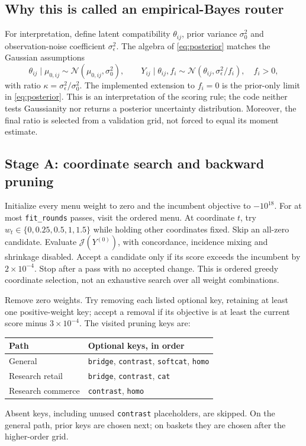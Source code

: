 \documentclass[11pt,a4paper]{article}
\newcommand{\code}[1]{\nolinkurl{#1}}
\numberwithin{equation}{section}
\begin{document}
\subsection{Why this is called an empirical-Bayes router}
For interpretation, define latent compatibility $\theta_{ij}$, prior variance
$\sigma_0^2$ and observation-noise coefficient $\sigma_\epsilon^2$. The algebra of
\eqref{eq:posterior} matches the Gaussian assumptions
\begin{equation}
 \theta_{ij}\mid\mu_{0,ij}\sim\mathcal N(\mu_{0,ij},\sigma_0^2),\qquad
 Y_{ij}\mid\theta_{ij},f_i\sim
       \mathcal N(\theta_{ij},\sigma_\epsilon^2/f_i),\quad f_i>0,
\end{equation}
with ratio $\kappa=\sigma_\epsilon^2/\sigma_0^2$. The implemented extension to $f_i=0$
is the prior-only limit in \eqref{eq:posterior}. This is an interpretation of the scoring
rule; the code neither tests Gaussianity nor returns a posterior uncertainty distribution.
Moreover, the final ratio is selected from a validation grid, not forced to equal its
moment estimate.

\subsection{Stage A: coordinate search and backward pruning}
Initialize every menu weight to zero and the incumbent objective to $-10^{18}$. For at
most \code{fit_rounds} passes, visit the ordered menu. At coordinate $t$, try
$w_t\in\{0,0.25,0.5,1,1.5\}$ while holding other coordinates fixed. Skip an all-zero
candidate. Evaluate $\mathcal J(Y^{(0)})$, with concordance, incidence mixing and shrinkage
disabled. Accept a candidate only if its score exceeds the incumbent by $2\times10^{-4}$.
Stop after a pass with no accepted change. This is ordered greedy coordinate selection,
not an exhaustive search over all weight combinations.

Remove zero weights. Try removing each listed optional key, retaining at least one
positive-weight key; accept a removal if its objective is at least the current score minus
$3\times10^{-4}$. The visited pruning keys are:
\begin{center}\small
\begin{tabular}{@{}ll@{}}
\toprule Path & Optional keys, in order \\\midrule
General & \code{bridge}, \code{contrast}, \code{softcat}, \code{homo} \\
Research retail & \code{bridge}, \code{contrast}, \code{cat} \\
Research commerce & \code{contrast}, \code{homo} \\
\bottomrule
\end{tabular}
\end{center}
Absent keys, including unused \code{contrast} placeholders, are skipped. On the general
path, prior keys are chosen next; on baskets they are chosen after the higher-order grid.
\end{document}
